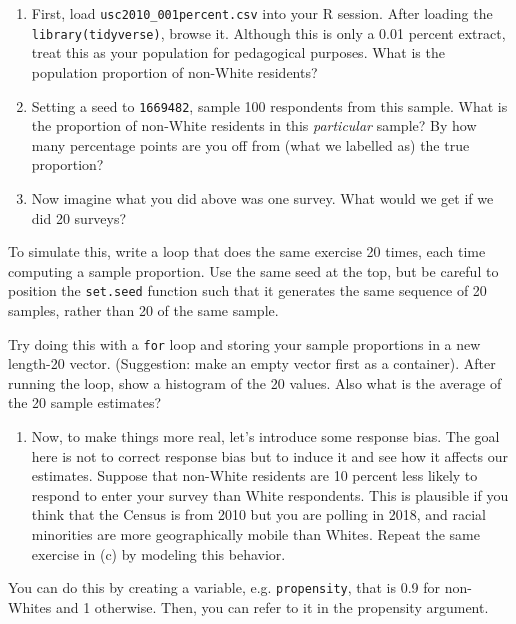 \documentclass[]{book}
\newenvironment{Shaded}{\begin{snugshade}}{\end{snugshade}}
\providecommand{\tightlist}{%
  \setlength{\itemsep}{0pt}\setlength{\parskip}{0pt}}
\theoremstyle{definition}
\theoremstyle{definition}
\theoremstyle{definition}
\theoremstyle{remark}
\begin{document}
\begin{Shaded}
\begin{Highlighting}[]
\begin{Shaded}
\begin{Highlighting}[]
\begin{Shaded}
\begin{Highlighting}[]
\begin{enumerate}
\def\labelenumi{(\alph{enumi})}
\item
  First, load \texttt{usc2010\_001percent.csv} into your R session. After loading the \texttt{library(tidyverse)}, browse it. Although this is only a 0.01 percent extract, treat this as your population for pedagogical purposes. What is the population proportion of non-White residents?
\item
  Setting a seed to \texttt{1669482}, sample 100 respondents from this sample. What is the proportion of non-White residents in this \emph{particular} sample? By how many percentage points are you off from (what we labelled as) the true proportion?
\item
  Now imagine what you did above was one survey. What would we get if we did 20 surveys?
\end{enumerate}

To simulate this, write a loop that does the same exercise 20 times, each time computing a sample proportion. Use the same seed at the top, but be careful to position the \texttt{set.seed} function such that it generates the same sequence of 20 samples, rather than 20 of the same sample.

Try doing this with a \texttt{for} loop and storing your sample proportions in a new length-20 vector. (Suggestion: make an empty vector first as a container). After running the loop, show a histogram of the 20 values. Also what is the average of the 20 sample estimates?

\begin{enumerate}
\def\labelenumi{(\alph{enumi})}
\setcounter{enumi}{3}
\tightlist
\item
  Now, to make things more real, let's introduce some response bias. The goal here is not to correct response bias but to induce it and see how it affects our estimates. Suppose that non-White residents are 10 percent less likely to respond to enter your survey than White respondents. This is plausible if you think that the Census is from 2010 but you are polling in 2018, and racial minorities are more geographically mobile than Whites. Repeat the same exercise in (c) by modeling this behavior.
\end{enumerate}

You can do this by creating a variable, e.g. \texttt{propensity}, that is 0.9 for non-Whites and 1 otherwise. Then, you can refer to it in the propensity argument.


\end{Highlighting}
\end{Shaded}
\end{Highlighting}
\end{Shaded}
\end{Highlighting}
\end{Shaded}
\end{document}
